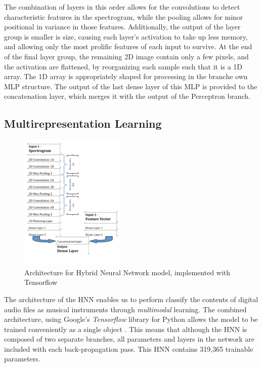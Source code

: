 \documentclass[conference,onecolumn,letterpaper]{IEEEtran}
\begin{document}
The combination of layers in this order allows for the convolutions to detect characteristic features in the spectrogram, while the pooling allows for minor positional in variance in those features. Additionally, the output of the layer group is smaller is size, causing each layer's activation to take up less memory, and allowing only the most prolific features of each input to survive. At the end of the final layer group, the remaining 2D image contain only a few pixels, and the activation are flattened, by reorganizing each sample such that it is a 1D array. The 1D array is appropriately shaped for processing in the branche own MLP structure. The output of the last dense layer of this MLP is provided to the concatenation layer, which merges it with the output of the Perceptron branch. 


\subsection{Multirepresentation Learning}
\label{subsec:Multimodal}


\begin{figure}[h]
    \centering
    \includegraphics[width=0.45\textwidth]{figures/NeuralNetworkArchitecture.png}
    \caption{Architecture for Hybrid Neural Network model, implemented with Tensorflow \cite{Tensorflow}}
    \label{fig:Architecture}
\end{figure}

The architecture of the HNN enables us to perform classify the contents of digital audio files as musical instruments through \textit{multimodal} learning. The combined architecture, using Google's \textit{Tensorflow} library for Python allows the model to be trained conveniently as a single object \cite{Tensorflow}. This means that although the HNN is composed of two separate branches, all parameters and layers in the network are included with each back-propagation pass. This HNN contains 319,365 trainable parameters.
\end{document}
